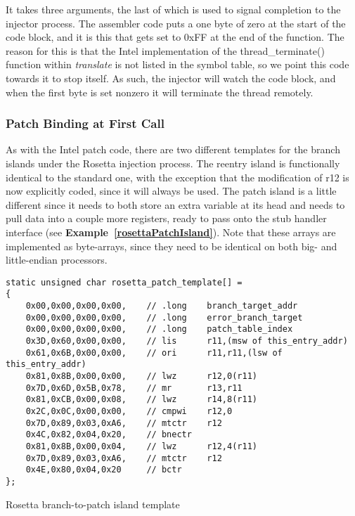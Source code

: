 \documentclass[english]{article}
\begin{document}
It takes three arguments, the last of which is used to signal completion to the injector process. The assembler code puts a one byte of zero at the start of the code block, and it is this that gets set to 0xFF at the end of the function. The reason for this is that the Intel implementation of the thread\_terminate() function within \textsl{translate} is not listed in the symbol table, so we point this code towards it to stop itself. As such, the injector will watch the code block, and when the first byte is set nonzero it will terminate the thread remotely.

\subsubsection{Patch Binding at First Call}
As with the Intel patch code, there are two different templates for the branch islands under the Rosetta injection process. The reentry island is functionally identical to the standard one, with the exception that the modification of r12 is now explicitly coded, since it will always be used. The patch island is a little different since it needs to both store an extra variable at its head and needs to pull data into a couple more registers, ready to pass onto the stub handler interface (see \textbf{Example~\ref{rosettaPatchIsland}}). Note that these arrays are implemented as byte-arrays, since they need to be identical on both big- and little-endian processors.

\begin{sourcecode}
\begin{verbatim}
static unsigned char rosetta_patch_template[] =
{
    0x00,0x00,0x00,0x00,    // .long    branch_target_addr
    0x00,0x00,0x00,0x00,    // .long    error_branch_target
    0x00,0x00,0x00,0x00,    // .long    patch_table_index
    0x3D,0x60,0x00,0x00,    // lis      r11,(msw of this_entry_addr)
    0x61,0x6B,0x00,0x00,    // ori      r11,r11,(lsw of this_entry_addr)
    0x81,0x8B,0x00,0x00,    // lwz      r12,0(r11)
    0x7D,0x6D,0x5B,0x78,    // mr       r13,r11
    0x81,0xCB,0x00,0x08,    // lwz      r14,8(r11)
    0x2C,0x0C,0x00,0x00,    // cmpwi    r12,0
    0x7D,0x89,0x03,0xA6,    // mtctr    r12
    0x4C,0x82,0x04,0x20,    // bnectr
    0x81,0x8B,0x00,0x04,    // lwz      r12,4(r11)
    0x7D,0x89,0x03,0xA6,    // mtctr    r12
    0x4E,0x80,0x04,0x20     // bctr
};
\end{verbatim}
\caption{Rosetta branch-to-patch island template}
\label{rosettaPatchIsland}
\end{sourcecode}
\end{document}
